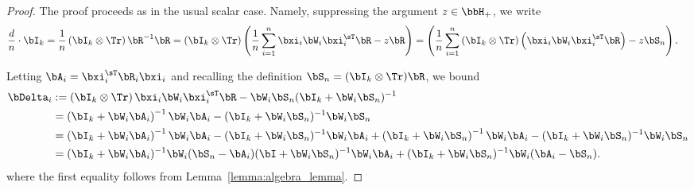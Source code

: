 \begin{proof}
The proof proceeds as in the usual scalar case.
Namely, suppressing the argument $z \in\bbH_+$, 
we write
\begin{align}
\label{eq:decomposition_resolvent_eq}
\frac{d}{n} \cdot \bI_k 
= \frac1n\left(\bI_k \otimes \Tr\right)
\bR^{-1} \bR
= \left(\bI_k \otimes \Tr\right)
\left(\frac1n\sum_{i=1}^n \bxi_i \bW_i\bxi_i^\sT \bR 
 -z  \bR\right)
&= 
\left(\frac1n\sum_{i=1}^n 
\left(\bI_k \otimes \Tr\right)\left(
\bxi_i \bW_i\bxi_i^\sT \bR \right)
 - z  \bS_n  \right).
\end{align}

Letting $\bA_i = \bxi_i^\sT \bR_i\bxi_i$ and recalling the definition $\bS_n = (\bI_k \otimes \Tr)\bR$, we bound
\begin{align*}
        \bDelta_i&:=
        \left(\bI_k \otimes \Tr\right)\bxi_i \bW_i \bxi_i^\sT \bR - \bW_i\bS_n(\bI_k + \bW_i\bS_n)^{-1} \\
        &=\left( \bI_k + \bW_i\bA_i\right)^{-1}\bW_i\bA_i
        - (\bI_k + \bW_i\bS_n)^{-1}\bW_i\bS_n\\
        &=
        \left( \bI_k + \bW_i\bA_i\right)^{-1}\bW_i\bA_i
        - (\bI_k + \bW_i\bS_n)^{-1}\bW_i\bA_i
       +\left( \bI_k + \bW_i\bS_n\right)^{-1}\bW_i\bA_i
        - (\bI_k + \bW_i\bS_n)^{-1}\bW_i\bS_n\\
&= (\bI_k +\bW_i\bA_i)^{-1}\bW_i (\bS_n -\bA_i) (\bI + \bW_i \bS_n)^{-1} \bW_i \bA_i
+ (\bI_k + \bW_i\bS_n)^{-1}\bW_i (\bA_i -\bS_n).
\end{align*}
where the first equality follows from Lemma~\ref{lemma:algebra_lemma}.


\end{proof}
